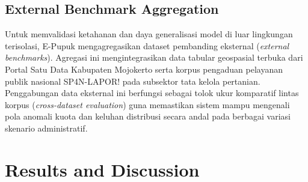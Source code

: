 \documentclass[conference]{IEEEtran}
\begin{document}
\begin{table}[htbp]
\caption{Detail Distribusi dan Partisi Dataset Terverifikasi E-Pupuk}
\begin{center}
\label{tab:dataset_distribution}
\end{center}
\end{table}

\subsection{External Benchmark Aggregation}
Untuk memvalidasi ketahanan dan daya generalisasi model di luar lingkungan terisolasi, E-Pupuk mengagregasikan dataset pembanding eksternal (\textit{external benchmarks}). Agregasi ini mengintegrasikan data tabular geospasial terbuka dari Portal Satu Data Kabupaten Mojokerto serta korpus pengaduan pelayanan publik nasional SP4N-LAPOR! pada subsektor tata kelola pertanian. Penggabungan data eksternal ini berfungsi sebagai tolok ukur komparatif lintas korpus (\textit{cross-dataset evaluation}) guna memastikan sistem mampu mengenali pola anomali kuota dan keluhan distribusi secara andal pada berbagai variasi skenario administratif.

\section{Results and Discussion}
\label{sec:results_and_discussion}
\end{document}
